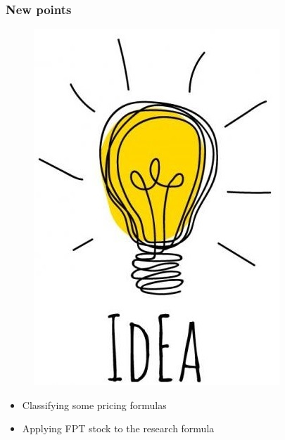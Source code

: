 \documentclass{beamer}
\begin{document}
\begin{frame}
\frametitle{New points}
\begin{figure}[htp]
	\begin{center}
		\includegraphics[scale=.3]{fig2}
	\end{center}
	\label{reffig2}
\end{figure} \pause
\begin{itemize}
	\item Classifying some pricing formulas \pause 
	\item Applying FPT stock to the research formula
\end{itemize}
\end{frame}
\end{document}
